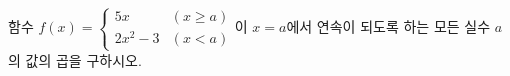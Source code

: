 함수 $f(x)=\begin{cases} 5x & (x\ge a) \\ 2x^2-3 & (x<a) \end{cases}$이 $x=a$에서 연속이 되도록 하는 모든 실수 $a$의 값의 곱을 구하시오.
